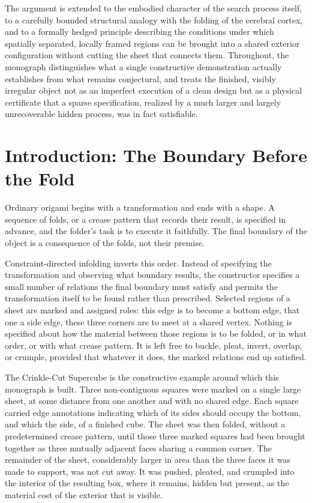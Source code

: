 \documentclass[11pt,oneside]{book}
\begin{document}
The argument is extended to the embodied character of the search process
itself, to a carefully bounded structural analogy with the folding of
the cerebral cortex, and to a formally hedged principle describing the
conditions under which spatially separated, locally framed regions can
be brought into a shared exterior configuration without cutting the
sheet that connects them. Throughout, the monograph distinguishes what a
single constructive demonstration actually establishes from what remains
conjectural, and treats the finished, visibly irregular object not as an
imperfect execution of a clean design but as a physical certificate that
a sparse specification, realized by a much larger and largely
unrecoverable hidden process, was in fact satisfiable.

\tableofcontents

\mainmatter

\hypertarget{introduction-the-boundary-before-the-fold}{%
\chapter*{Introduction: The Boundary Before the Fold}
\label{introduction-the-boundary-before-the-fold}}

Ordinary origami begins with a transformation and ends with a shape. A
sequence of folds, or a crease pattern that records their result, is
specified in advance, and the folder's task is to execute it faithfully.
The final boundary of the object is a consequence of the folds, not
their premise.

Constraint-directed infolding inverts this order. Instead of specifying
the transformation and observing what boundary results, the constructor
specifies a small number of relations the final boundary must satisfy
and permits the transformation itself to be found rather than
prescribed. Selected regions of a sheet are marked and assigned roles:
this edge is to become a bottom edge, that one a side edge, these three
corners are to meet at a shared vertex. Nothing is specified about how
the material between those regions is to be folded, or in what order, or
with what crease pattern. It is left free to buckle, pleat, invert,
overlap, or crumple, provided that whatever it does, the marked
relations end up satisfied.

The Crinkle-Cut Supercube is the constructive example around which this
monograph is built. Three non-contiguous squares were marked on a single
large sheet, at some distance from one another and with no shared edge.
Each square carried edge annotations indicating which of its sides
should occupy the bottom, and which the side, of a finished cube. The
sheet was then folded, without a predetermined crease pattern, until
those three marked squares had been brought together as three mutually
adjacent faces sharing a common corner. The remainder of the sheet,
considerably larger in area than the three faces it was made to support,
was not cut away. It was pushed, pleated, and crumpled into the interior
of the resulting box, where it remains, hidden but present, as the
material cost of the exterior that is visible.
\end{document}
